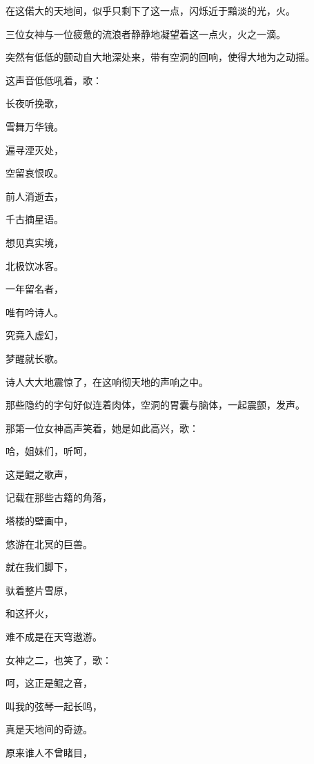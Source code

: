 \documentclass[UTF8]{article}
\begin{document}
\par 在这偌大的天地间，似乎只剩下了这一点，闪烁近于黯淡的光，火。
\par 三位女神与一位疲惫的流浪者静静地凝望着这一点火，火之一滴。
\\[0.6cm]
\par 突然有低低的颤动自大地深处来，带有空洞的回响，使得大地为之动摇。
\\[0.6cm]
\par 这声音低低吼着，歌：
\\[0.6cm]
\par 长夜听挽歌，
\par 雪舞万华镜。
\par 遍寻湮灭处，
\par 空留哀恨叹。
\par 前人消逝去，
\par 千古摘星语。
\par 想见真实境，
\par 北极饮冰客。
\par 一年留名者，
\par 唯有吟诗人。
\par 究竟入虚幻，
\par 梦醒就长歌。
\\[0.6cm]
\par 诗人大大地震惊了，在这响彻天地的声响之中。
\par 那些隐约的字句好似连着肉体，空洞的胃囊与脑体，一起震颤，发声。
\\[0.6cm]
\par 那第一位女神高声笑着，她是如此高兴，歌：
\\[0.6cm]
\par 哈，姐妹们，听呵，
\par 这是鲲之歌声，
\par 记载在那些古籍的角落，
\par 塔楼的壁画中，
\par 悠游在北冥的巨兽。
\par 就在我们脚下，
\par 驮着整片雪原，
\par 和这抔火，
\par 难不成是在天穹遨游。
\\[0.6cm]
\par 女神之二，也笑了，歌：
\\[0.6cm]
\par 呵，这正是鲲之音，
\par 叫我的弦琴一起长鸣，
\par 真是天地间的奇迹。
\par 原来谁人不曾睹目，
\end{document}
